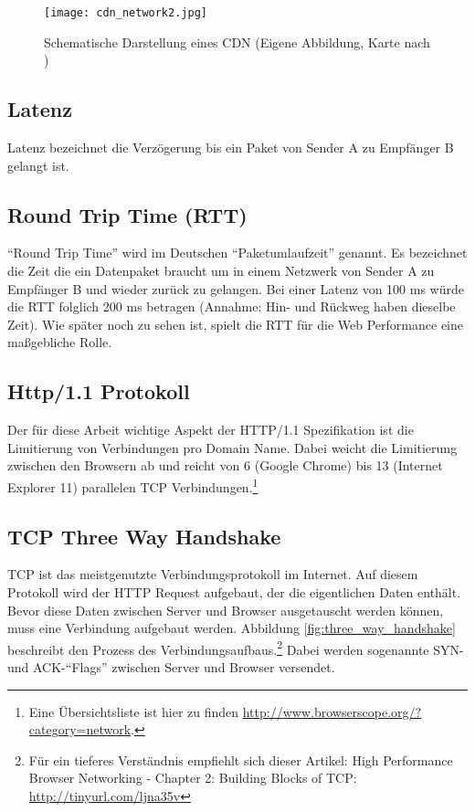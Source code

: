 		\begin{figure}[htbp]
			\begin{center}
				\texttt{[image: cdn\_network2.jpg]}
				\caption{Schematische Darstellung eines CDN (Eigene Abbildung, Karte nach \autocite{ritz14})}
				\label{fig:cdn_network}
			\end{center}
		\end{figure}
		


	\subsection{Latenz} %
	\label{sub:latenz}
		Latenz bezeichnet die Verzögerung bis ein Paket von Sender A zu Empfänger B gelangt ist.


	\subsection{Round Trip Time (RTT)} %
	\label{sub:round_trip_time_}
		"`Round Trip Time"' wird im Deutschen "`Paketumlaufzeit"' genannt. Es bezeichnet die Zeit die ein Datenpaket braucht um in einem Netzwerk von Sender A zu Empfänger B und wieder zurück zu gelangen. Bei einer Latenz von 100 ms würde die RTT folglich 200 ms betragen (Annahme: Hin- und Rückweg haben dieselbe Zeit). Wie später noch zu sehen ist, spielt die RTT für die Web Performance eine maßgebliche Rolle.
	


	\subsection{Http/1.1 Protokoll}
	\label{sub:http_1_1_Protokoll}
		Der für diese Arbeit wichtige Aspekt der HTTP/1.1 Spezifikation ist die Limitierung von Verbindungen pro Domain Name. Dabei weicht die Limitierung zwischen den Browsern ab und reicht von 6 (Google Chrome) bis 13 (Internet Explorer 11) parallelen TCP Verbindungen.\footnote{Eine Übersichtsliste ist hier zu finden \url{http://www.browserscope.org/?category=network}.}


	\subsection{TCP Three Way Handshake}
	\label{sub:tcp_three_way_handshake}
		TCP ist das meistgenutzte Verbindungsprotokoll im Internet. Auf diesem Protokoll wird der HTTP Request aufgebaut, der die eigentlichen Daten enthält.
		Bevor diese Daten zwischen Server und Browser ausgetauscht werden können, muss eine Verbindung aufgebaut werden. Abbildung \ref{fig:three_way_handshake} beschreibt den Prozess des Verbindungsaufbaus.\footnote{Für ein tieferes Verständnis empfiehlt sich dieser Artikel: High Performance Browser Networking - Chapter 2: Building Blocks of TCP: \url{http://tinyurl.com/ljna35v}} Dabei werden sogenannte SYN- und ACK-"`Flags"' zwischen Server und Browser versendet.

